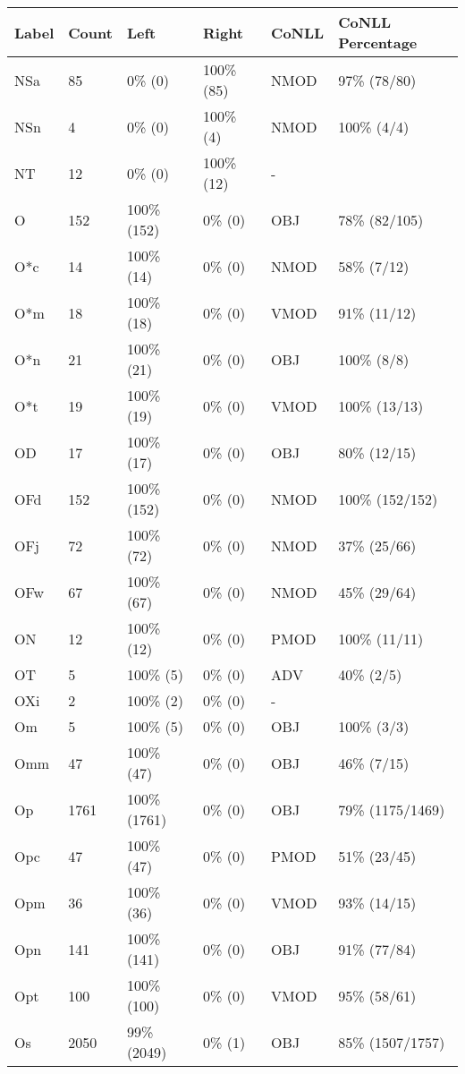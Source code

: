 \begin{figure*}
\begin{tabular}{|l|l|l|l||l|l|}
\hline
Label & Count & Left & Right & CoNLL & CoNLL Percentage\\ 
\hline
 NSa & 85 & 0\% (0) & 100\% (85) & NMOD & 97\% (78/80) \\ 
\hline
 NSn & 4 & 0\% (0) & 100\% (4) & NMOD & 100\% (4/4) \\ 
\hline
 NT & 12 & 0\% (0) & 100\% (12) & - &  \\ 
\hline
 O & 152 & 100\% (152) & 0\% (0) & OBJ & 78\% (82/105) \\ 
\hline
 O*c & 14 & 100\% (14) & 0\% (0) & NMOD & 58\% (7/12) \\ 
\hline
 O*m & 18 & 100\% (18) & 0\% (0) & VMOD & 91\% (11/12) \\ 
\hline
 O*n & 21 & 100\% (21) & 0\% (0) & OBJ & 100\% (8/8) \\ 
\hline
 O*t & 19 & 100\% (19) & 0\% (0) & VMOD & 100\% (13/13) \\ 
\hline
 OD & 17 & 100\% (17) & 0\% (0) & OBJ & 80\% (12/15) \\ 
\hline
 OFd & 152 & 100\% (152) & 0\% (0) & NMOD & 100\% (152/152) \\ 
\hline
 OFj & 72 & 100\% (72) & 0\% (0) & NMOD & 37\% (25/66) \\ 
\hline
 OFw & 67 & 100\% (67) & 0\% (0) & NMOD & 45\% (29/64) \\ 
\hline
 ON & 12 & 100\% (12) & 0\% (0) & PMOD & 100\% (11/11) \\ 
\hline
 OT & 5 & 100\% (5) & 0\% (0) & ADV & 40\% (2/5) \\ 
\hline
 OXi & 2 & 100\% (2) & 0\% (0) & - &  \\ 
\hline
 Om & 5 & 100\% (5) & 0\% (0) & OBJ & 100\% (3/3) \\ 
\hline
 Omm & 47 & 100\% (47) & 0\% (0) & OBJ & 46\% (7/15) \\ 
\hline
 Op & 1761 & 100\% (1761) & 0\% (0) & OBJ & 79\% (1175/1469) \\ 
\hline
 Opc & 47 & 100\% (47) & 0\% (0) & PMOD & 51\% (23/45) \\ 
\hline
 Opm & 36 & 100\% (36) & 0\% (0) & VMOD & 93\% (14/15) \\ 
\hline
 Opn & 141 & 100\% (141) & 0\% (0) & OBJ & 91\% (77/84) \\ 
\hline
 Opt & 100 & 100\% (100) & 0\% (0) & VMOD & 95\% (58/61) \\ 
\hline
 Os & 2050 & 99\% (2049) & 0\% (1) & OBJ & 85\% (1507/1757) \\ 

\end{tabular}
\end{figure*}
